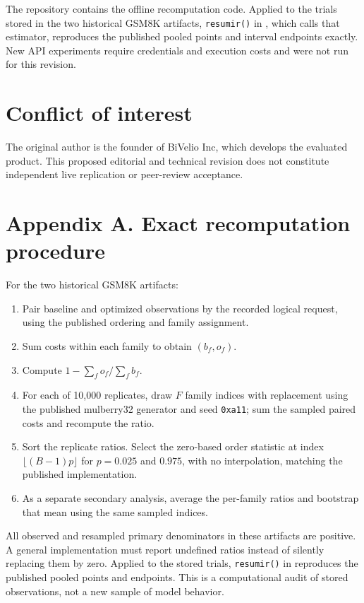 \documentclass[11pt,a4paper]{article}
\begin{document}
The repository contains the offline recomputation code. Applied to the trials stored in the two
historical GSM8K artifacts, \texttt{resumir()} in ,
which calls that estimator, reproduces the published pooled points and interval endpoints
exactly. New API experiments require credentials and execution costs and were not run for this
revision.

\section{Conflict of interest}\label{sec:coi}
The original author is the founder of BiVelio Inc, which develops the evaluated product. This
proposed editorial and technical revision does not constitute independent live replication or
peer-review acceptance.

\clearpage

\section*{Appendix A. Exact recomputation procedure}
For the two historical GSM8K artifacts:
\begin{enumerate}[leftmargin=1.6em]
  \item Pair baseline and optimized observations by the recorded logical request, using the
  published ordering and family assignment.
  \item Sum costs within each family to obtain $(b_f,o_f)$.
  \item Compute $1-\sum_f o_f / \sum_f b_f$.
  \item For each of 10{,}000 replicates, draw $F$ family indices with replacement using the
  published mulberry32 generator and seed \texttt{0xa11}; sum the sampled paired costs and
  recompute the ratio.
  \item Sort the replicate ratios. Select the zero-based order statistic at index
  $\lfloor (B-1)p\rfloor$ for $p=0.025$ and $0.975$, with no interpolation, matching the
  published implementation.
  \item As a separate secondary analysis, average the per-family ratios and bootstrap that mean
  using the same sampled indices.
\end{enumerate}
All observed and resampled primary denominators in these artifacts are positive. A general
implementation must report undefined ratios instead of silently replacing them by zero.
Applied to the stored trials, \texttt{resumir()} in 
reproduces the published pooled points and endpoints. This is a computational audit of stored
observations, not a new sample of model behavior.
\end{document}
